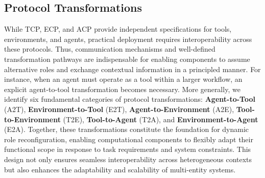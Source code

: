 \documentclass[11pt]{article}
\begin{document}
\subsection{Protocol Transformations}

While TCP, ECP, and ACP provide independent specifications for tools, environments, and agents, practical deployment requires interoperability across these protocols. Thus, communication mechanisms and well-defined transformation pathways are indispensable for enabling components to assume alternative roles and exchange contextual information in a principled manner. For instance, when an agent must operate as a tool within a larger workflow, an explicit agent-to-tool transformation becomes necessary. More generally, we identify six fundamental categories of protocol transformations: \textbf{Agent-to-Tool} (A2T), \textbf{Environment-to-Tool} (E2T), \textbf{Agent-to-Environment} (A2E), \textbf{Tool-to-Environment} (T2E), \textbf{Tool-to-Agent} (T2A), and \textbf{Environment-to-Agent} (E2A). Together, these transformations constitute the foundation for dynamic role reconfiguration, enabling computational components to flexibly adapt their functional scope in response to task requirements and system constraints. This design not only ensures seamless interoperability across heterogeneous contexts but also enhances the adaptability and scalability of multi-entity systems.
\end{document}
